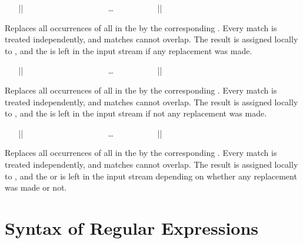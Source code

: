 \documentclass[oneside]{book}
\begin{document}
\begin{function}{\RegexReplaceCaseAllT}
\begin{syntax}
~ ~ |{|
~ ~ ~ ~  
~ ~ ~ ~  
~ ~ ~ ~ \ldots
~ ~ ~ ~  
~ ~ |}| 
~ ~ 
\end{syntax}
Replaces all occurrences of all  in the 
by the corresponding .  Every match is
treated independently, and matches cannot overlap. The result is
assigned locally to , and the 
is left in the input stream if any replacement was made.
\end{function}

\begin{function}{\RegexReplaceCaseAllF}
\begin{syntax}
~ ~ |{|
~ ~ ~ ~  
~ ~ ~ ~  
~ ~ ~ ~ \ldots
~ ~ ~ ~  
~ ~ |}| 
~ ~ 
\end{syntax}
Replaces all occurrences of all  in the 
by the corresponding .  Every match is
treated independently, and matches cannot overlap. The result is
assigned locally to , and the  is left
in the input stream if not any replacement was made.
\end{function}

\begin{function}{\RegexReplaceCaseAllTF}
\begin{syntax}
~ ~ |{|
~ ~ ~ ~  
~ ~ ~ ~  
~ ~ ~ ~ \ldots
~ ~ ~ ~  
~ ~ |}| 
~ ~  
\end{syntax}
Replaces all occurrences of all  in the  by the corresponding .  Every match is
treated independently, and matches cannot overlap.  The result is
assigned locally to , and the  or
 is left in the input stream depending on whether
any replacement was made or not.
\end{function}

\section{Syntax of Regular Expressions}
\end{document}
